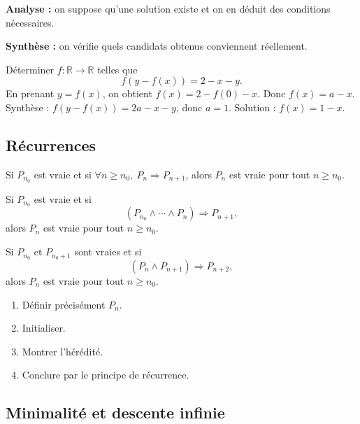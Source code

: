 \documentclass[11pt,a4paper]{article}
\newcommand{\R}{\mathbb{R}}
\newcommand{\et}{\wedge}
\newcommand{\imp}{\Rightarrow}
\begin{document}
\begin{methodebox}
\textbf{Analyse :} on suppose qu'une solution existe et on en déduit des conditions nécessaires.

\textbf{Synthèse :} on vérifie quels candidats obtenus conviennent réellement.
\end{methodebox}

\begin{exemplebox}
Déterminer \(f:\R\to\R\) telles que
\[
f(y-f(x))=2-x-y.
\]
En prenant \(y=f(x)\), on obtient \(f(x)=2-f(0)-x\). Donc \(f(x)=a-x\). Synthèse : \(f(y-f(x))=2a-x-y\), donc \(a=1\). Solution : \(f(x)=1-x\).
\end{exemplebox}

\subsection{Récurrences}

\begin{theorembox}
Si \(P_{n_0}\) est vraie et si \(\forall n\geq n_0,\ P_n\imp P_{n+1}\), alors \(P_n\) est vraie pour tout \(n\geq n_0\).
\end{theorembox}

\begin{theorembox}
Si \(P_{n_0}\) est vraie et si
\[
(P_{n_0}\et\cdots\et P_n)\imp P_{n+1},
\]
alors \(P_n\) est vraie pour tout \(n\geq n_0\).
\end{theorembox}

\begin{theorembox}
Si \(P_{n_0}\) et \(P_{n_0+1}\) sont vraies et si
\[
(P_n\et P_{n+1})\imp P_{n+2},
\]
alors \(P_n\) est vraie pour tout \(n\geq n_0\).
\end{theorembox}

\begin{methodebox}
\begin{enumerate}
    \item Définir précisément \(P_n\).
    \item Initialiser.
    \item Montrer l'hérédité.
    \item Conclure par le principe de récurrence.
\end{enumerate}
\end{methodebox}

\subsection{Minimalité et descente infinie}
\end{document}
